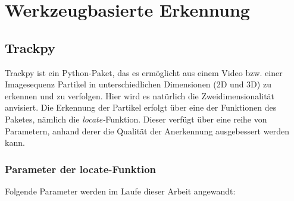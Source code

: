 \section{Werkzeugbasierte Erkennung}

\subsection{Trackpy}
Trackpy ist ein Python-Paket, das es ermöglicht aus einem Video bzw. einer Imagesequenz Partikel in unterschiedlichen Dimensionen (2D und 3D) zu erkennen und zu verfolgen. Hier wird es natürlich die Zweidimensionalität anvisiert. Die Erkennung der Partikel erfolgt über eine der Funktionen des Paketes, nämlich die \textit{locate-}Funktion.
Dieser verfügt über eine reihe von Parametern, anhand derer die Qualität der Anerkennung ausgebessert werden kann.

	\subsubsection{Parameter der locate-Funktion}
		Folgende Parameter werden im Laufe dieser Arbeit angewandt:

